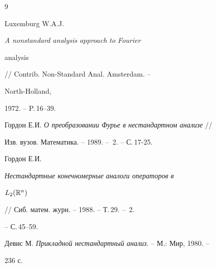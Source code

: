  


\begin{thebibliography}{9} 


 




Luxemburg W.A.J. {\em A nonstandard analysis approach to Fourier 


analysis} // Contrib. Non-Standard Anal. Amsterdam. -- 


North-Holland, 


1972. -- P.\,16--39. 




Гордон Е.И. {\em О преобразовании Фурье в нестандартном анализе} // 


Изв. вузов. Математика. -- 1989. -- \No\,2. -- С.\,17-25. 




Гордон Е.И. {\em Нестандартные конечномерные аналоги операторов в 


$L_2(\Bbb R^n)$} // Сиб. матем. журн. -- 1988. -- Т.\,29. -- \No\,2. 


-- С.\,45--59. 




Девис М. {\em Прикладной нестандартный анализ}. -- М.: Мир, 1980. -- 


236 с. 


 


\end{thebibliography} 


 


\vskip 2cm 


 








 


\label{end} 


 


